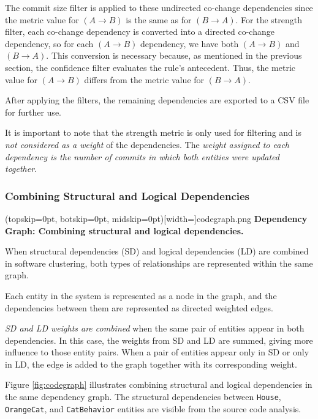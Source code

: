 \documentclass{ieeeaccess}
\begin{document}
The commit size filter is applied to these undirected co-change dependencies since the metric value for $(A \rightarrow B)$ is the same as for $(B \rightarrow A)$. For the strength filter, each co-change dependency is converted into a directed co-change dependency, so for each $(A \rightarrow B)$ dependency, we have both $(A \rightarrow B)$ and $(B \rightarrow A)$. This conversion is necessary because, as mentioned in the previous section, the confidence filter evaluates the rule's antecedent. Thus, the metric value for $(A \rightarrow B)$ differs from the metric value for $(B \rightarrow A)$.

After applying the filters, the remaining dependencies are exported to a CSV file for further use.

It is important to note that the strength metric is only used for filtering and is \textit{not considered as a weight} of the dependencies. The \textit{weight assigned to each dependency is the number of commits in which both entities were updated together}.


\subsubsection{Combining Structural and Logical Dependencies}

\Figure[t!](topskip=0pt, botskip=0pt, midskip=0pt)[width=\textwidth]{codegraph.png}
{ \textbf{Dependency Graph: Combining structural and logical dependencies.}\label{fig:codegraph}}

When structural dependencies (SD) and logical dependencies (LD) are combined in software clustering, both types of relationships are represented within the same graph.

Each entity in the system is represented as a node in the graph, and the dependencies between them are represented as directed weighted edges.

\textit{SD and LD weights are combined} when the same pair of entities appear in both dependencies. In this case, the weights from SD and LD are summed, giving more influence to those entity pairs. When a pair of entities appear only in SD or only in LD, the edge is added to the graph together with its corresponding weight.

Figure \ref{fig:codegraph} illustrates combining structural and logical dependencies in the same dependency graph. The structural dependencies between \texttt{House}, \texttt{OrangeCat}, and \texttt{CatBehavior} entities are visible from the source code analysis.
\end{document}
